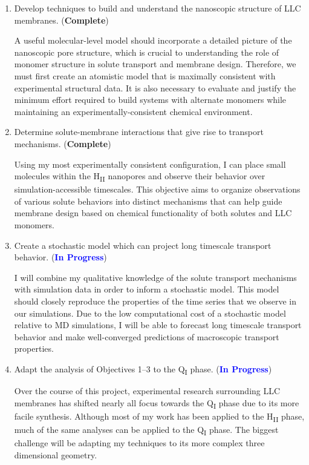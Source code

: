 \documentclass{article}
\begin{document}
  \begin{enumerate}
  
    \item Develop techniques to build and understand the nanoscopic structure
    of LLC membranes. (\textcolor{green!40!olive}{\textbf{Complete}})

    A useful molecular-level model should incorporate a detailed picture 
    of the nanoscopic pore structure, which is crucial to understanding
    the role of monomer structure in solute transport and membrane design.
    Therefore, we must first create an atomistic model that is maximally 
    consistent with experimental structural data. It is also necessary to
    evaluate and justify the minimum effort required to build systems with
    alternate monomers while maintaining an experimentally-consistent 
    chemical environment. 
    
    \item Determine solute-membrane interactions that give rise to
    transport mechanisms. (\textcolor{green!40!olive}{\textbf{Complete}})
    
    Using my most experimentally consistent configuration, I can place 
    small molecules within the H\textsubscript{II} nanopores and observe
    their behavior over simulation-accessible timescales. This objective 
    aims to organize observations of various solute behaviors into
    distinct mechanisms that can help guide membrane design based on 
    chemical functionality of both solutes and LLC monomers.
    
    \item Create a stochastic model which can project long timescale 
    transport behavior. (\textcolor{blue}{\textbf{In Progress}})
    
    I will combine my qualitative knowledge of the solute transport mechanisms
    with simulation data in order to inform a stochastic model. This model
    should closely reproduce the properties of the time series that we observe 
    in our simulations. Due to the low computational cost of a stochastic model
    relative to MD simulations, I will be able to forecast long timescale transport
    behavior and make well-converged predictions of macroscopic transport properties.
           
    \item Adapt the analysis of Objectives 1--3 to the Q\textsubscript{I} phase. (\textcolor{blue}{\textbf{In Progress}})
    
    Over the course of this project, experimental research surrounding
    LLC membranes has shifted nearly all focus towards the Q\textsubscript{I}
    phase due to its more facile synthesis.	Although most of my work has 
    been applied to the H\textsubscript{II} phase, much of the same analyses
    can be applied to the Q\textsubscript{I} phase. The biggest challenge will
    be adapting my techniques to its more complex three dimensional geometry.
    
  \end{enumerate}
\end{document}
